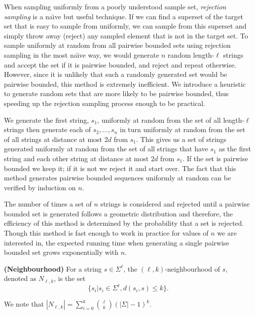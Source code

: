 When sampling uniformly from a poorly understood sample set, {\em rejection sampling} is a na\"{\i}ve but useful technique.  If we can find a superset of the target set that is easy to sample from uniformly, we can sample from this superset and simply throw away (reject) any sampled element that is not in the target set.  To sample uniformly at random from all pairwise bounded sets using rejection sampling in the most na\"{\i}ve way, we would generate $n$ random length-$\ell$ strings and accept the set if it is pairwise bounded, and reject and repeat otherwise.  However, since it is unlikely that such a randomly generated set would be pairwise bounded, this method is extremely inefficient.  We introduce a heuristic to generate random sets that are more likely to be pairwise bounded, thus speeding up the rejection sampling process enough to be practical.

We generate the first string, $s_1$, uniformly at random from the set of all length-$\ell$ strings then generate each of $s_2,\ldots,s_n$ in turn uniformly at random from the set of all strings at distance at most $2d$ from $s_1$.  This gives us a set of strings generated uniformly at random from the set of all strings that have $s_1$ as the first string and each other string at distance at most $2d$ from $s_1$.  If the set is pairwise bounded we keep it; if it is not we reject it and start over.  The fact that this method generates pairwise bounded sequences uniformly at random can be verified by induction on $n$.

The number of times a set of $n$ strings is considered and rejected until a pairwise bounded set is generated follows a geometric distribution and therefore, the efficiency of this method is determined by the probability that a set is rejected.  Though this method is fast enough to work in practice for values of $n$ we are interested in, the expected running time when generating a single pairwise bounded set grows exponentially with $n$.

\begin{definition} {\bf (Neighbourhood)} For a string $s \in \Sigma^{\ell}$, the $(\ell, k)$-neighbourhood of $s$, denoted as $N_{\ell, k}$, is the set $$\{ s_i | s_i \in \Sigma^{\ell}, d(s_i, s) \leq k \}.$$ \end{definition}

\noindent We note that $|N_{\ell, k}| = \sum_{i = 0}^{k} {{\ell}\choose{k}}(|\Sigma| - 1)^{k}$.  

